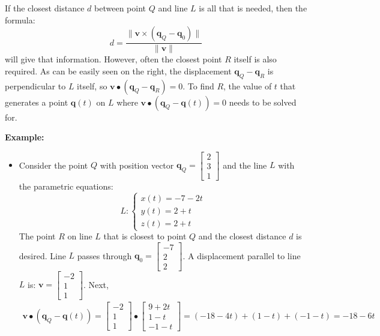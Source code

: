 \documentclass{article}
\begin{document}
If the closest distance \(d\) between point \(Q\) and line \(L\) is all that is needed, then the formula:
\[d = \frac{\|\mathbf{v} \times (\mathbf{q}_Q - \mathbf{q}_0)\|}{\|\mathbf{v}\|}\]
will give that information. However, often the closest point \(R\) itself is also required. As can be easily seen on the right, the displacement \(\mathbf{q}_Q - \mathbf{q}_R\) is perpendicular to \(L\) itself, so \(\mathbf{v} \bullet (\mathbf{q}_Q - \mathbf{q}_R) = 0\). To find \(R\), the value of \(t\) that generates a point \(\mathbf{q}(t)\) on \(L\) where \(\mathbf{v} \bullet (\mathbf{q}_Q - \mathbf{q}(t)) = 0\) needs to be solved for.

\textbf{Example:}
\begin{itemize}
\item Consider the point \(Q\) with position vector \(\mathbf{q}_Q = \begin{bmatrix} 2 \\ 3 \\ 1 \end{bmatrix}\) and the line \(L\) with the parametric equations:
\[L: \left\{\begin{array}{c} x(t) = -7 - 2t \\ y(t) = 2 + t \\ z(t) = 2 + t \end{array}\right.\] 
The point \(R\) on line \(L\) that is closest to point \(Q\) and the closest distance \(d\) is desired. 
Line \(L\) passes through \(\mathbf{q}_0 = \begin{bmatrix} -7 \\ 2 \\ 2 \end{bmatrix}\). A displacement parallel to line \(L\) is: \(\mathbf{v} = \begin{bmatrix} -2 \\ 1 \\ 1 \end{bmatrix}\). Next, 
\begin{align*}
\mathbf{v} \bullet (\mathbf{q}_Q - \mathbf{q}(t)) = \begin{bmatrix} -2 \\ 1 \\ 1 \end{bmatrix} \bullet \begin{bmatrix} 9 + 2t \\ 1 - t \\ -1 - t \end{bmatrix} 
= (-18 - 4t) + (1 - t) + (-1 - t) = -18 - 6t

\end{align*}
\end{itemize}
\end{document}
